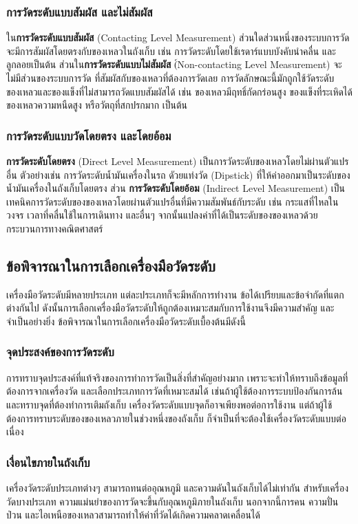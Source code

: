 \documentclass[final,11pt,a4paper]{article}
\begin{document}
\subsubsection{การวัดระดับแบบสัมผัส และไม่สัมผัส}
ใน\textbf{การวัดระดับแบบสัมผัส} (Contacting Level Measurement) ส่วนใดส่วนหนึ่งของระบบการวัด จะมีการสัมผัสโดยตรงกับของเหลวในถังเก็บ
เช่น การวัดระดับโดยใช้เรดาร์แบบบังคับนำคลื่น และลูกลอยเป็นต้น ส่วนใน\textbf{การวัดระดับแบบไม่สัมผัส} (์Non-contacting Level Measurement)
จะไม่มีส่วนของระบบการวัด ที่สัมผัสกับของเหลวที่ต้องการวัดเลย การวัดลักษณะนี้มักถูกใช้วัดระดับของเหลวและของแข็งที่ไม่สามารถวัดแบบสัมผัสได้ เช่น
ของเหลวมีฤทธิ์กัดกร่อนสูง ของแข็งที่ระเหิดได้ ของเหลวความหนืดสูง หรือวัตถุที่สกปรกมาก เป็นต้น
\subsubsection{การวัดระดับแบบวัดโดยตรง และโดยอ้อม}
\textbf{การวัดระดับโดยตรง} (Direct Level Measurement) เป็นการวัดระดับของเหลวโดยไม่ผ่านตัวแปรอื่น ตัวอย่างเช่น
 การวัดระดับน้ำมันเครื่องในรถ ดัวยแท่งวัด (Dipstick) ที่ให้ค่าออกมาเป็นระดับของน้ำมันเครื่องในถังเก็บโดยตรง 
 ส่วน \textbf{การวัดระดับโดยอ้อม} (Indirect Level Measurement) เป็นเทคนิคการวัดระดับของของเหลวโดยผ่านตัวแปรอื่นที่มีความสัมพันธ์กับระดับ เช่น กระแสที่ไหลในวงจร 
 เวลาที่คลื่นใช้ในการเดินทาง และอื่นๆ จากนั้นแปลงค่าที่ได้เป็นระดับของของเหลวด้วยกระบวนการทางคณิตศาสตร์
\subsection{ข้อพิจารณาในการเลือกเครื่องมือวัดระดับ}
เครื่องมือวัดระดับมีหลายประเภท แต่ละประเภทก็จะมีหลักการทำงาน ข้อได้เปรียบและข้อจำกัดที่แตกต่างกันไป 
ดังนั้นการเลือกเครื่องมือวัดระดับให้ถูกต้องเหมาะสมกับการใช้งานจึงมีความสำคัญ และจำเป็นอย่างยิ่ง ข้อพิจารณาในการเลือกเครื่องมือวัดระดับเบื้องต้นมีดังนี้
\subsubsection{จุดประสงค์ของการวัดระดับ} 
การทราบจุดประสงค์ที่แท้จริงของการทำการวัดเป็นสิ่งที่สำคัญอย่างมาก เพราะจะทำให้ทราบถึงข้อมูลที่ต้องการจากเครื่องวัด และเลือกประเภทการวัดที่เหมาะสมได้
เช่นถ้าผู้ใช้ต้องการระบบป้องกันการล้น และทราบจุดที่ต้องทำการเติมถังเก็บ เครื่องวัดระดับแบบจุดก็อาจเพียงพอต่อการใช้งาน 
แต่ถ้าผู้ใช้ต้องการทราบระดับของของเหลวภายในช่วงหนึ่งของถังเก็บ ก็จำเป็นที่จะต้องใช้เครื่องวัดระดับแบบต่อเนื่อง
\subsubsection{เงื่อนไขภายในถังเก็บ}
เครื่องวัดระดับประเภทต่างๆ สามารถทนต่ออุณหภูมิ และความดันในถังเก็บได้ไม่เท่ากัน สำหรับเครื่องวัดบางประเภท ความแม่นยำของการวัดจะขึ้นกับอุณหภูมิภายในถังเก็บ
นอกจากนี้การคน ความปั่นป่วน และไอเหนือของเหลวสามารถทำให้ค่าที่วัดได้เกิดความคลาดเคลื่อนได้ 
\end{document}
